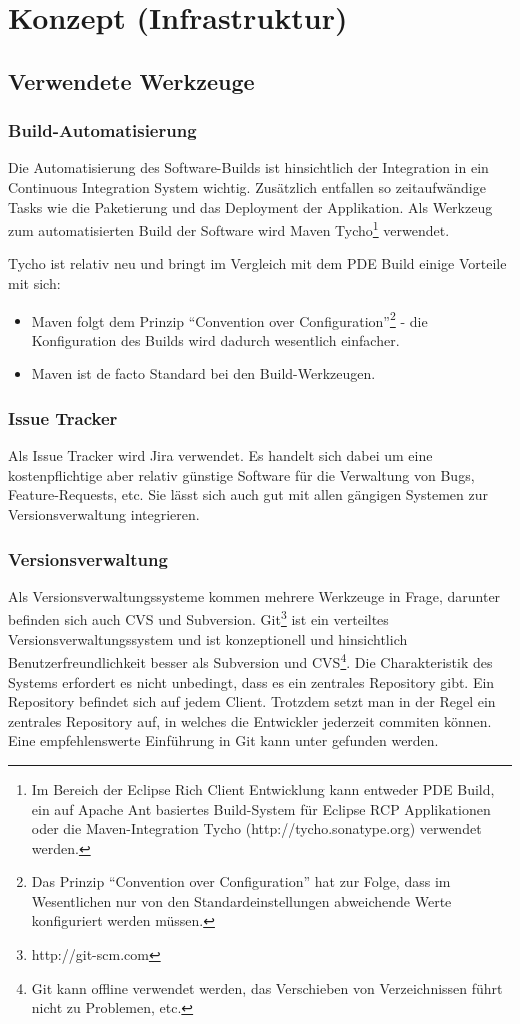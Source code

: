 \chapter{Konzept (Infrastruktur)}\label{konzept_3}
\section{Verwendete Werkzeuge}
\subsection{Build-Automatisierung}
Die Automatisierung des Software-Builds ist hinsichtlich der Integration in ein Continuous Integration System wichtig. Zusätzlich entfallen so zeitaufwändige Tasks wie die Paketierung und das Deployment der Applikation.
Als Werkzeug zum automatisierten Build der Software wird Maven Tycho\footnote{Im Bereich der Eclipse Rich Client Entwicklung kann entweder PDE Build, ein auf Apache Ant basiertes Build-System für Eclipse RCP Applikationen\cite{vogelZapfPdeBuild} oder die Maven-Integration Tycho (http://tycho.sonatype.org) verwendet werden.} verwendet.

Tycho ist relativ neu und bringt im Vergleich mit dem PDE Build einige Vorteile mit sich:
\begin{itemize}
	\item Maven folgt dem Prinzip ``Convention over Configuration''\footnote{Das Prinzip ``Convention over Configuration'' hat zur Folge, dass im Wesentlichen nur von den Standardeinstellungen abweichende Werte konfiguriert werden müssen.} - die Konfiguration des Builds wird dadurch wesentlich einfacher.
	\item Maven ist de facto Standard bei den Build-Werkzeugen.
\end{itemize}

\subsection{Issue Tracker}\label{issue_tracker}
Als Issue Tracker wird Jira verwendet. Es handelt sich dabei um eine kostenpflichtige aber relativ günstige Software für die Verwaltung von Bugs, Feature-Requests, etc. Sie lässt sich auch gut mit allen gängigen Systemen zur Versionsverwaltung integrieren.

\subsection{Versionsverwaltung}
Als Versionsverwaltungssysteme kommen mehrere Werkzeuge in Frage, darunter befinden sich auch CVS und Subversion. Git\footnote{http://git-scm.com} ist ein verteiltes Versionsverwaltungssystem und ist konzeptionell und hinsichtlich Benutzerfreundlichkeit besser als Subversion und CVS\footnote{Git kann offline verwendet werden, das Verschieben von Verzeichnissen führt nicht zu Problemen, etc.}. Die Charakteristik des Systems erfordert es nicht unbedingt, dass es ein zentrales Repository gibt. Ein Repository befindet sich auf jedem Client. Trotzdem setzt man in der Regel ein zentrales Repository auf, in welches die Entwickler jederzeit commiten können. Eine empfehlenswerte Einführung in Git kann unter \cite{dilger201111}  gefunden werden.

